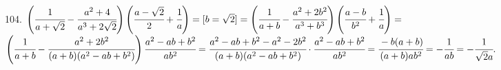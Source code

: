 104. $\left(\cfrac{1}{a+\sqrt{2}}-\cfrac{a^2+4}{a^3+2\sqrt{2}}\right) \left (\cfrac{a-\sqrt{2}}{2}+\cfrac{1}{a}\right)=[b=\sqrt{2}]=
\left(\cfrac{1}{a+b}-\cfrac{a^2+2b^2}{a^3+b^3}\right) \left (\cfrac{a-b}{b^2}+\cfrac{1}{a}\right)=$\\$\left(\cfrac{1}{a+b}-\cfrac{a^2+2b^2}{(a+b)(a^2-ab+b^2)}\right) \cfrac{a^2-ab+b^2}{ab^2}=\cfrac{a^2-ab+b^2-a^2-2b^2}{(a+b)(a^2-ab+b^2)}\cdot
\cfrac{a^2-ab+b^2}{ab^2}=\cfrac{-b(a+b)}{(a+b)ab^2}=-\cfrac{1}{ab}=-\cfrac{1}{\sqrt{2}a}.$\\
